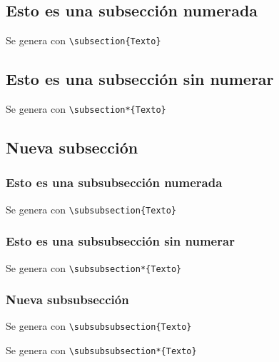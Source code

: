 \subsection{Esto es una subsección numerada}

Se genera con \verb!\subsection{Texto}!

\subsection*{Esto es una subsección sin numerar}

Se genera con \verb!\subsection*{Texto}!

\subsection{Nueva subsección}

\subsubsection{Esto es una subsubsección numerada}

Se genera con \verb!\subsubsection{Texto}!

\subsubsection*{Esto es una subsubsección sin numerar}

Se genera con \verb!\subsubsection*{Texto}!

\subsubsection{Nueva subsubsección}


Se genera con \verb!\subsubsubsection{Texto}!


Se genera con \verb!\subsubsubsection*{Texto}!

